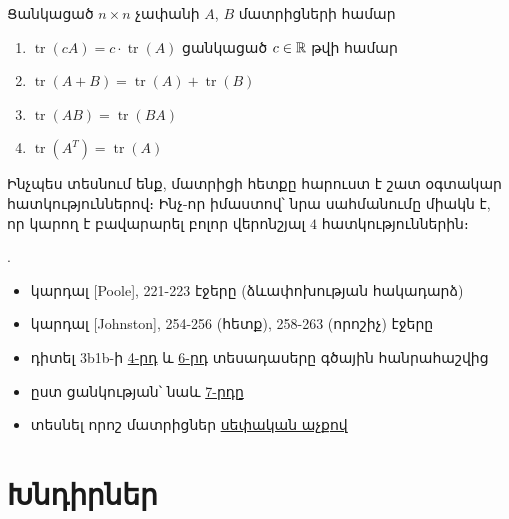 \begin{theorem}
Ցանկացած $n \times n$ չափանի  $A$, $B$ մատրիցների համար

\begin{enumerate}
\item \(\operatorname{tr}(cA) = c \cdot \operatorname{tr}(A)\) ցանկացած $c\in \mathbb{R}$ թվի համար

\item \(\operatorname{tr}(A + B) = \operatorname{tr}(A) + \operatorname{tr}(B)\)

\item \(\operatorname{tr}(AB) = \operatorname{tr}(BA)\) 

\item \(\operatorname{tr}(A^T) = \operatorname{tr}(A)\)
\end{enumerate}
\end{theorem}

Ինչպես տեսնում ենք, մատրիցի հետքը հարուստ է շատ օգտակար հատկություններով։ Ինչ-որ իմաստով՝ նրա սահմանումը միակն է, որ կարող է բավարարել բոլոր վերոնշյալ $4$ հատկություններին։



\bigskip 

\begin{theory}
.
\begin{itemize}
\item կարդալ [{\rm Poole}], 221-223 էջերը (ձևափոխության հակադարձ)
\item կարդալ [{\rm Johnston}], 254-256 (հետք), 258-263 (որոշիչ) էջերը  
\item դիտել  {\rm 3b1b}-ի \href{https://www.3blue1brown.com/lessons/matrix-multiplication}{4-րդ} և \href{https://www.3blue1brown.com/lessons/determinant}{6-րդ} տեսադասերը գծային հանրահաշվից 
\item ըստ ցանկության՝ նաև \href{https://www.3blue1brown.com/lessons/inverse-matrices}{7-րդը}
\item տեսնել որոշ մատրիցներ \href{https://intuitive-math.club/linear-algebra/matrices}{սեփական աչքով}
\end{itemize}
\end{theory}

\newpage

\section{Խնդիրներ}

